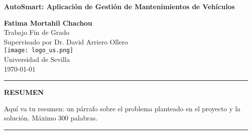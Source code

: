 \documentclass[12pt,a4paper]{book}
\begin{document}
\begin{titlepage}
    \thispagestyle{plain}
    \setcounter{page}{1}
    \centering
    \vspace*{2cm}
    \noindent
    \colorbox{uscream}{
        \parbox{0.85\textwidth}{
            \centering
            \vspace{0.5cm}
            {\bfseries\LARGE\color{usred} AutoSmart: Aplicación de Gestión de Mantenimientos de Vehículos\\[0.2cm]}
            \vspace{0.5cm}
        }
    }
    \vspace{1.5cm}

    {\Large\color{usred}\textbf{Fatima Mortahil Chachou}}\\[0.5cm]
    {\large\color{usred}Trabajo Fin de Grado}\\[0.2cm]
    {\large\color{usred}Supervisado por Dr. David Arriero Ollero}\\[2cm]

    \texttt{[image: logo\_us.png]}\\[1.5cm]

    {\large\color{usred}Universidad de Sevilla}\\[0.5cm]
    {\large\color{usred}\today}
    \vfill
    {\color{usred}\textbf{\thepage}}
\end{titlepage}

\newpage
\thispagestyle{plain}
\setcounter{page}{2}
\noindent
\color{usred}\rule{\textwidth}{3pt}
\vspace{1.5cm}

\begin{center}
    {\LARGE\bfseries\color{usred} RESUMEN}
\end{center}

\vspace{1.5cm}

\begin{center}
    \begin{minipage}{0.8\textwidth}
        \centering
        Aquí va tu resumen: un párrafo sobre el problema planteado en el proyecto y la solución. Máximo 300 palabras.
    \end{minipage}
\end{center}

\vfill
\color{usred}\rule{\textwidth}{3pt}
\end{document}
